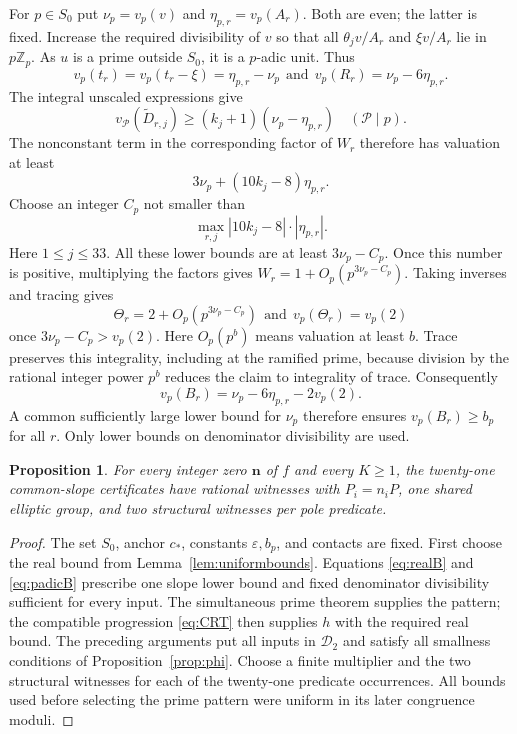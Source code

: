 \documentclass[11pt,reqno]{amsart}
\newtheorem{proposition}[theorem]{Proposition}
\theoremstyle{definition}
\numberwithin{equation}{section}
\newcommand{\Z}{\mathbb Z}
\def\t{\text}
\begin{document}
For $p\in S_0$ put $\nu_p=v_p(v)$ and $\eta_{p,r}=v_p(A_r)$. Both are even; the latter is fixed. Increase the required divisibility of $v$ so that all $\theta_jv/A_r$ and $\xi v/A_r$ lie in $p\Z_p$. As $u$ is a prime outside $S_0$, it is a $p$-adic unit. Thus
\[
 v_p(t_r)=v_p(t_r-\xi)=\eta_{p,r}-\nu_p\ \ \t{and}\ \ 
  v_p(R_r)=\nu_p-6\eta_{p,r}.
\]
The integral unscaled expressions give
\[
 v_{\mathcal P}(\widetilde D_{r,j})\ge(k_j+1)(\nu_p-\eta_{p,r})
 \quad({\mathcal P}\mid p).
\]
The nonconstant term in the corresponding factor of $W_r$ therefore has valuation at least
\begin{equation}\label{eq:secondWbound}
 3\nu_p+(10k_j-8)\eta_{p,r}.
\end{equation}
Choose an integer $C_p$ not smaller than
\[
 \max_{r,j}|10k_j-8|\cdot|\eta_{p,r}|.
\]
Here $1\le j\le33$. All these lower bounds are at least $3\nu_p-C_p$. Once this number is positive, multiplying the factors gives $W_r=1+O_p(p^{3\nu_p-C_p})$. Taking inverses and tracing gives
\begin{equation}\label{eq:padicTheta}
 \Theta_r=2+O_p(p^{3\nu_p-C_p})\ \ \t{and}\ \ 
 v_p(\Theta_r)=v_p(2)
\end{equation}
once $3\nu_p-C_p>v_p(2)$. Here $O_p(p^b)$ means valuation at least $b$. Trace preserves this integrality, including at the ramified prime, because division by the rational integer power $p^b$ reduces the claim to integrality of trace. Consequently
\begin{equation}\label{eq:padicB}
 v_p(B_r)=\nu_p-6\eta_{p,r}-2v_p(2).
\end{equation}
A common sufficiently large lower bound for $\nu_p$ therefore ensures $v_p(B_r)\ge b_p$ for all $r$. Only lower bounds on denominator divisibility are used.

\begin{proposition}\label{prop:complete}
For every integer zero $\mathbf n$ of $f$ and every $K\ge1$, the twenty-one common-slope certificates have rational witnesses with $P_i=n_iP$, one shared elliptic group, and two structural witnesses per pole predicate.
\end{proposition}
\begin{proof}
The set $S_0$, anchor $c_\ast$, constants $\varepsilon,b_p$, and contacts are fixed. First choose the real bound from Lemma~\ref{lem:uniformbounds}. Equations \eqref{eq:realB} and \eqref{eq:padicB} prescribe one slope lower bound and fixed denominator divisibility sufficient for every input. The simultaneous prime theorem supplies the pattern; the compatible progression \eqref{eq:CRT} then supplies $h$ with the required real bound. The preceding arguments put all inputs in $\mathcal D_2$ and satisfy all smallness conditions of Proposition~\ref{prop:phi}. Choose a finite multiplier and the two structural witnesses for each of the twenty-one predicate occurrences.  All bounds used before selecting the prime pattern were uniform in its later congruence moduli.
\end{proof}
\end{document}
